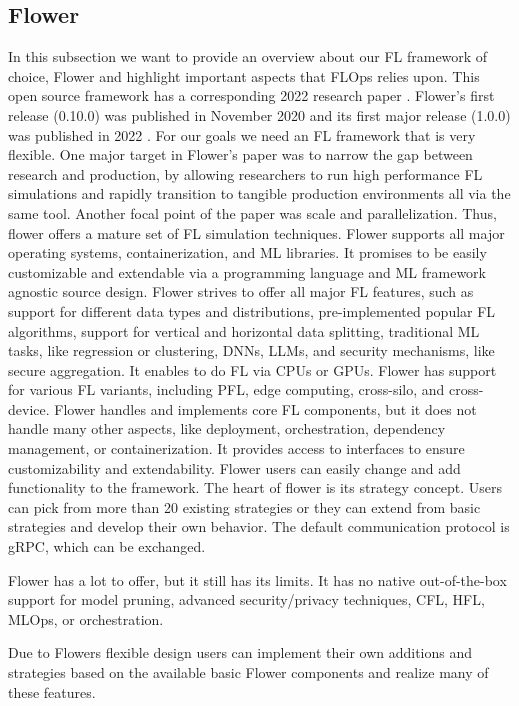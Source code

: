\subsection{Flower}

In this subsection we want to provide an overview about our FL framework of choice, Flower
and highlight important aspects that FLOps relies upon.
This open source framework has a corresponding 2022 research paper \cite{paper:flower}.
Flower's first release (0.10.0) was published in November 2020
and its first major release (1.0.0) was published in 2022 \cite{fl_framework:flower}.
For our goals we need an FL framework that is very flexible.
One major target in Flower's paper was to narrow the gap between research and production,
by allowing researchers to run high performance FL simulations and rapidly transition
to tangible production environments all via the same tool.
Another focal point of the paper was scale and parallelization.
Thus, flower offers a mature set of FL simulation techniques.
Flower supports all major operating systems, containerization, and ML libraries.
It promises to be easily customizable and extendable via a programming language and ML framework agnostic source design.
Flower strives to offer all major FL features, such as support for different data types and distributions,
pre-implemented popular FL algorithms, support for vertical and horizontal data splitting,
traditional ML tasks, like regression or clustering, DNNs, LLMs, and security mechanisms, like secure aggregation.
It enables to do FL via CPUs or GPUs.
Flower has support for various FL variants, including
PFL, edge computing, cross-silo, and cross-device.
Flower handles and implements core FL components,
but it does not handle many other aspects, like deployment, orchestration,
dependency management, or containerization.
It provides access to interfaces to ensure customizability and extendability.
Flower users can easily change and add functionality to the framework.
The heart of flower is its strategy concept.
Users can pick from more than 20 existing strategies or they can extend from basic strategies
and develop their own behavior.
The default communication protocol is gRPC, which can be exchanged.

Flower has a lot to offer, but it still has its limits.
It has no native out-of-the-box support for model pruning,
advanced security/privacy techniques, CFL, HFL, MLOps, or orchestration.

Due to Flowers flexible design users can implement their own additions and strategies
based on the available basic Flower components and realize many of these features.

